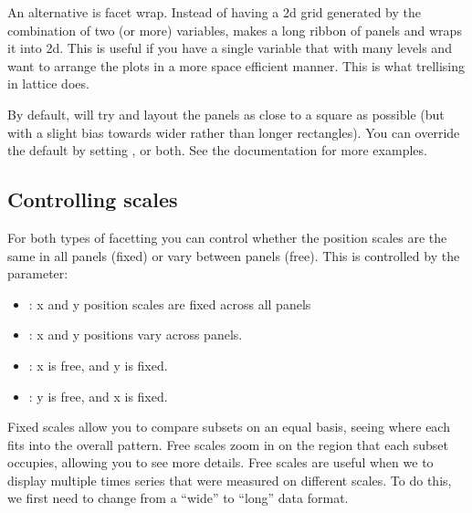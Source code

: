 An alternative is facet wrap.  Instead of having a 2d grid generated by the combination of two (or more) variables,  makes a long ribbon of panels and wraps it into 2d.  This is useful if you have a single variable that with many levels and want to arrange the plots in a more space efficient manner.  This is what trellising in lattice does.

% 


By default,  will try and layout the panels as close to a square as possible (but with a slight bias towards wider rather than longer rectangles).  You can override the default by setting ,  or both.  See the documentation for more examples.

\subsection{Controlling scales}
\label{sub:controlling_scales}

For both types of facetting you can control whether the position scales are the same in all panels (fixed) or vary between panels (free).  This is controlled by the  parameter:

\begin{itemize}
  \item {}: x and y position scales are fixed across all panels
  \item {}: x and y positions vary across panels.
  \item {}: x is free, and y is fixed.
  \item {}: y is free, and x is fixed.
\end{itemize}

% 


Fixed scales allow you to compare subsets on an equal basis, seeing where each fits into the overall pattern.  Free scales zoom in on the region that each subset occupies, allowing you to see more details.  Free scales are useful when we to display multiple times series that were measured on different scales.  To do this, we first need to change from a ``wide'' to ``long'' data format.

